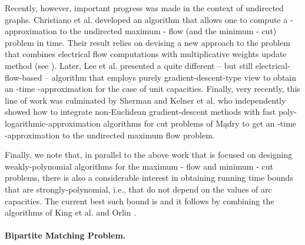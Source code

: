 \documentclass[11pt, letterpaper]{article}
\begin{document}
  Recently, however, important progress was made in the context of undirected graphs. Christiano et al. \cite{ChristianoKMST11} developed an algorithm that allows one to compute a -approximation to the undirected maximum - flow (and the minimum - cut) problem in  time. Their result relies on devising a new approach to the problem that combines electrical flow computations with multiplicative weights update method (see \cite{AroraHK05}). Later, Lee et al. \cite{LeeRS13} presented a quite different -- but still electrical-flow-based -- algorithm that employs purely gradient-descent-type view to obtain an -time -approximation for the case of unit capacities. Finally, very recently, this line of work was culminated by Sherman \cite{Sherman13} and Kelner et al. \cite{KelnerLOS13} who independently showed how to integrate non-Euclidean gradient-descent methods with fast poly-logarithmic-approximation algorithms for cut problems of M\k{a}dry \cite{Madry10b} to get an -time -approximation to the undirected maximum flow problem. 
  
Finally, we note that, in parallel to the above work that is focused on designing weakly-polynomial algorithms for the maximum - flow and minimum - cut problems, there is also a considerable interest in obtaining running time bounds that are strongly-polynomial, i.e., that do not depend on the values of arc capacities. The current best such bound is  and it follows by combining the algorithms of King et al. \cite{KingRT94} and Orlin \cite{Orlin13}. 
  
  
  
  
  
  
  
  
  \paragraph{Bipartite Matching Problem.}
  
\end{document}
